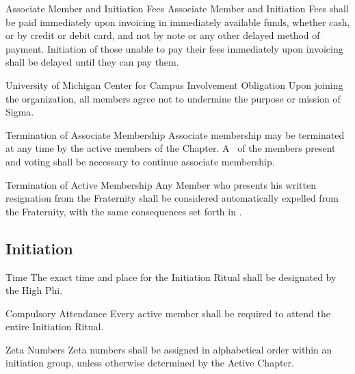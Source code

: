 \documentclass{article}
\begin{document}
\begin{subsubsectionList}
  \item {\titleStyle Associate Member and Initiation Fees\titleSuffix}
  Associate Member and Initiation Fees shall be paid immediately upon invoicing
  in immediately available funds, whether cash, or by credit or debit card, and
  not by note or any other delayed method of payment. Initiation of those unable
  to pay their fees immediately upon invoicing shall be delayed until they can
  pay them.

  \item {\titleStyle University of Michigan Center for Campus Involvement Obligation\titleSuffix}
  Upon joining the organization, all members agree not to undermine the purpose
  or mission of Sigma.

  \item {\titleStyle Termination of Associate Membership\titleSuffix}
  Associate membership may be terminated  at any time by the active members of the Chapter. A
  \voteForInitiation\ of the members present and voting shall be necessary to
  continue associate membership.

  \item {\titleStyle Termination of Active Membership\titleSuffix}
  Any Member who presents his written resignation  from the Fraternity
  shall be considered automatically expelled from the Fraternity, with the same
  consequences set forth in .
\end{subsubsectionList}

\subsection{Initiation}

\begin{subsubsectionList}
  \item {\titleStyle Time\titleSuffix}
  The exact time and place for the Initiation Ritual shall be designated by the
  High Phi.

  \item {\titleStyle Compulsory Attendance\titleSuffix}
  Every active member shall be required to attend the entire Initiation Ritual.

  \item {\titleStyle Zeta Numbers\titleSuffix}
  Zeta numbers shall be assigned in alphabetical order within an initiation
  group, unless otherwise determined by the Active Chapter.
\end{subsubsectionList}
\end{document}
